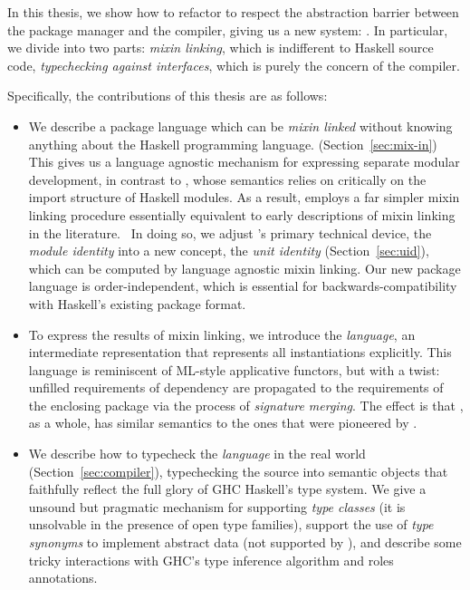 In this thesis, we show how to refactor
\OldBackpack{} to respect the abstraction barrier between the package
manager and the compiler, giving us a new system: \Backpack{}.  In
particular, we divide \Backpack{} into two parts: \emph{mixin linking},
which is indifferent to Haskell source code, \emph{typechecking against
interfaces}, which is purely the concern of the compiler.

Specifically, the contributions of this thesis are as follows:
\begin{itemize}

    \item We describe a package language which can be \emph{mixin
    linked} without knowing anything about the Haskell programming
    language. (Section~\ref{sec:mix-in})  This gives us a language agnostic mechanism for
    expressing separate modular development, in contrast to
    \OldBackpack{}, whose semantics relies on critically on the import structure
    of Haskell modules.  As a result, \Backpack{}
    employs a far simpler mixin linking procedure essentially equivalent
    to early descriptions of mixin linking in the literature.~\cite{cardelli:linksets}
    In doing so, we adjust \OldBackpack{}'s primary technical device,
    the \emph{module identity} into a new concept, the \emph{unit identity} (Section~\ref{sec:uid}),
    which can be computed by language agnostic mixin linking.
    Our new package language is order-independent, which is
    essential for backwards-compatibility with Haskell's existing
    package format.

    \item To express the results of mixin linking, we introduce the
    \emph{\unit{} language}, an intermediate representation that
    represents all instantiations explicitly.  This language is reminiscent of
    ML-style applicative functors, but with a twist:
    unfilled requirements of dependency are propagated to the requirements
    of the enclosing package via the process of \emph{signature merging}.
    The effect is that \Backpack{}, as a whole, has similar
    semantics to the ones that were pioneered by \OldBackpack{}.

    \item We describe how to typecheck the \emph{\unit{} language} in the
    real world (Section~\ref{sec:compiler}), typechecking the source into semantic objects that
    faithfully reflect the full glory of GHC Haskell's type system.
    We give a unsound but pragmatic mechanism for supporting \emph{type classes}
    (it is unsolvable in the presence of open type families), support
    the use of \emph{type synonyms} to implement abstract data
    (not supported by \OldBackpack{}), and describe
    some tricky interactions with GHC's type inference algorithm and
    roles annotations.


\end{itemize}
